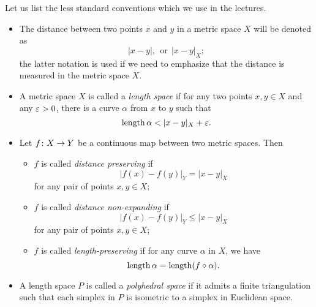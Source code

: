 Let us list the less standard conventions which we use in the lectures.
\begin{itemize}
\item The distance between two points $x$ and $y$ in a metric space $X$
will be denoted as 
$$|x-y|,
\ \ 
\text{or}\ \  |x-y|_X;$$ 
the latter notation is used if we need to emphasize that the distance is measured in the metric space $X$.

\item A metric space $X$ is called a \emph{length space} if for any two points $x,y\in X$ and any $\varepsilon>0$, there is a curve $\alpha$ from $x$ to $y$ such that
$$\length \alpha<|x-y|_X+\eps.$$

\item \label{def:length-preserving}
Let  $f\:X\z\to Y$ be a continuous map between two metric spaces.
Then
\begin{itemize}
\item $f$ is called \emph{distance preserving} if
$$|f(x)-f(y)|_Y=|x-y|_X$$
for any pair of points $x,y\in X$;
\item $f$ is called \emph{distance non-expanding} if
$$|f(x)-f(y)|_Y\le|x-y|_X$$
for any pair of points $x,y\in X$;
\item $f$ is called \emph{length-preserving} if for any curve $\alpha$ in $X$,
we have 
$$\operatorname{length}\alpha=\operatorname{length}(f\circ\alpha).$$
\end{itemize}
\item A length space $P$ is called a \emph{polyhedral space}
if it admits a finite triangulation such that each simplex in $P$ is isometric to a simplex in Euclidean space.
\end{itemize}



